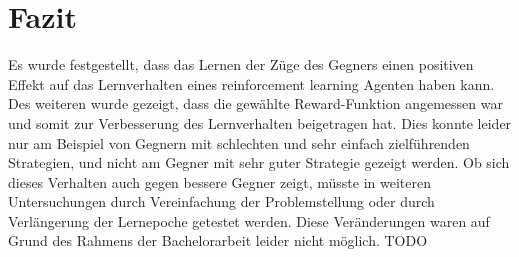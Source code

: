 \chapter{Fazit}%

\label{cha:Fazit}
Es wurde festgestellt, dass das Lernen der Züge des Gegners einen positiven Effekt auf das Lernverhalten eines reinforcement learning Agenten haben kann. 
Des weiteren wurde gezeigt, dass die  gewählte Reward-Funktion angemessen war und somit zur Verbesserung des Lernverhalten beigetragen hat.
Dies konnte leider nur am Beispiel von Gegnern mit schlechten und sehr einfach zielführenden Strategien, und nicht am Gegner mit sehr guter Strategie gezeigt werden.
Ob sich dieses Verhalten auch gegen bessere Gegner zeigt, müsste in weiteren Untersuchungen durch Vereinfachung der Problemstellung oder durch Verlängerung der Lernepoche getestet werden.
Diese Veränderungen waren auf Grund des Rahmens der Bachelorarbeit leider nicht möglich.
\colorbox{red!30}{TODO}



